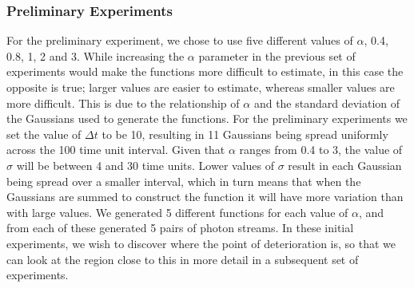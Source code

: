 \documentclass[a4paper,11pt]{article}
\begin{document}
\subsubsection{Preliminary Experiments}
\label{sec-8-2-1}

For the preliminary experiment, we chose to use five different values of
$\alpha$, 0.4, 0.8, 1, 2 and 3. While increasing the $\alpha$ parameter in the
previous set of experiments would make the functions more difficult to estimate,
in this case the opposite is true; larger values are easier to estimate, whereas
smaller values are more difficult. This is due to the relationship of $\alpha$
and the standard deviation of the Gaussians used to generate the functions. For
the preliminary experiments we set the value of $\Delta t$ to be 10, resulting
in 11 Gaussians being spread uniformly across the 100 time unit interval. Given
that $\alpha$ ranges from 0.4 to 3, the value of $\sigma$ will be between 4 and
30 time units. Lower values of $\sigma$ result in each Gaussian being spread
over a smaller interval, which in turn means that when the Gaussians are summed
to construct the function it will have more variation than with large values. We
generated 5 different functions for each value of $\alpha$, and from each of
these generated 5 pairs of photon streams. In these initial experiments, we wish
to discover where the point of deterioration is, so that we can look at the
region close to this in more detail in a subsequent set of experiments.
\end{document}
